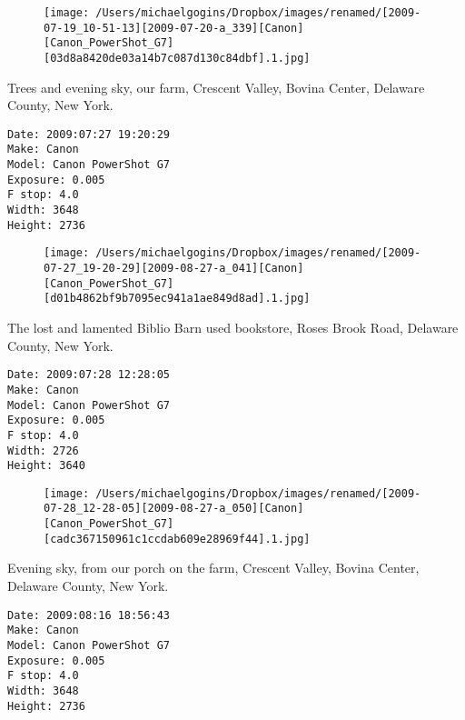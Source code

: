 \documentclass[11pt,letter,DIV=14,paper=landscape]{scrbook}
\begin{document}
\begin{figure}
\texttt{[image: /Users/michaelgogins/Dropbox/images/renamed/[2009-07-19\_10-51-13][2009-07-20-a\_339][Canon][Canon\_PowerShot\_G7][03d8a8420de03a14b7c087d130c84dbf].1.jpg]}
\end{figure}
    
\clearpage
\noindent Trees and evening sky, our farm, Crescent Valley, Bovina Center, Delaware County, New York.
\noindent
\begin{lstlisting}
Date: 2009:07:27 19:20:29
Make: Canon
Model: Canon PowerShot G7
Exposure: 0.005
F stop: 4.0
Width: 3648
Height: 2736
\end{lstlisting}
\clearpage

\begin{figure}
\texttt{[image: /Users/michaelgogins/Dropbox/images/renamed/[2009-07-27\_19-20-29][2009-08-27-a\_041][Canon][Canon\_PowerShot\_G7][d01b4862bf9b7095ec941a1ae849d8ad].1.jpg]}
\end{figure}
    
\clearpage
\noindent The lost and lamented Biblio Barn used bookstore, Roses Brook Road, Delaware County, New York.
\noindent
\begin{lstlisting}
Date: 2009:07:28 12:28:05
Make: Canon
Model: Canon PowerShot G7
Exposure: 0.005
F stop: 4.0
Width: 2726
Height: 3640
\end{lstlisting}
\clearpage

\begin{figure}
\texttt{[image: /Users/michaelgogins/Dropbox/images/renamed/[2009-07-28\_12-28-05][2009-08-27-a\_050][Canon][Canon\_PowerShot\_G7][cadc367150961c1ccdab609e28969f44].1.jpg]}
\end{figure}
    
\clearpage
\noindent Evening sky, from our porch on the farm, Crescent Valley, Bovina Center, Delaware County, New York.
\noindent
\begin{lstlisting}
Date: 2009:08:16 18:56:43
Make: Canon
Model: Canon PowerShot G7
Exposure: 0.005
F stop: 4.0
Width: 3648
Height: 2736
\end{lstlisting}
\clearpage
\end{document}
